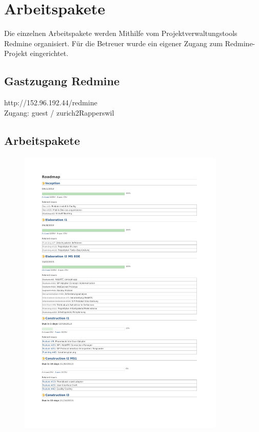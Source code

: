 \chapter{Arbeitspakete}
Die einzelnen Arbeitspakete werden Mithilfe vom Projektverwaltungstools Redmine organisiert. Für die Betreuer wurde ein eigener Zugang zum Redmine-Projekt eingerichtet.

\section{Gastzugang Redmine}
http://152.96.192.44/redmine \\
Zugang: guest / zurich2Rapperswil \\

\section{Arbeitspakete}
	\begin{figure}[H]
		\includegraphics[trim=1.75cm 2cm 2cm 2.5cm, clip=true,page=1,width=0.88\textwidth]{../projektplan/media/roadmap.pdf}
	\end{figure}

